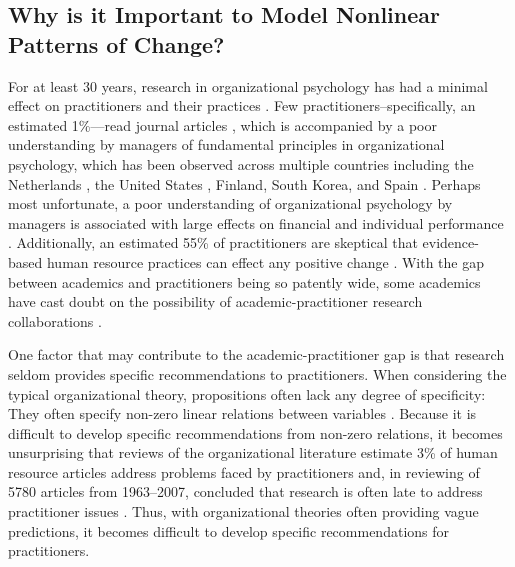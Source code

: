 \documentclass[
12pt, %
twoside,
english]{guelphthesis}
\begin{document}
\hypertarget{why-is-it-important-to-model-nonlinear-patterns-of-change}{%
\subsection{Why is it Important to Model Nonlinear Patterns of Change?}\label{why-is-it-important-to-model-nonlinear-patterns-of-change}}

For at least 30 years, research in organizational psychology has had a minimal effect on practitioners and their practices \autocites{daft1990}[for a review, see][]{lawler2022}. Few practitioners--specifically, an estimated 1\%---read journal articles \autocite{rynes2002a}, which is accompanied by a poor understanding by managers of fundamental principles in organizational psychology, which has been observed across multiple countries including the Netherlands \autocite{sanders2008}, the United States \autocite{rynes2002a}, Finland, South Korea, and Spain \autocite{tenhiälä2014}. Perhaps most unfortunate, a poor understanding of organizational psychology by managers is associated with large effects on financial and individual performance \autocite[for a review, see][]{rynes2002b}. Additionally, an estimated 55\% of practitioners are skeptical that evidence-based human resource practices can effect any positive change \autocite{kpmg2015}. With the gap between academics and practitioners being so patently wide, some academics have cast doubt on the possibility of academic-practitioner research collaborations \autocite{kieser2009}.

One factor that may contribute to the academic-practitioner gap is that research seldom provides specific recommendations to practitioners. When considering the typical organizational theory, propositions often lack any degree of specificity: They often specify non-zero linear relations between variables \autocite{edwards2010}. Because it is difficult to develop specific recommendations from non-zero relations, it becomes unsurprising that reviews of the organizational literature estimate 3\% of human resource articles address problems faced by practitioners \autocite{sackett1990} and, in reviewing of 5780 articles from 1963--2007, concluded that research is often late to address practitioner issues \autocite{cascio2008}. Thus, with organizational theories often providing vague predictions, it becomes difficult to develop specific recommendations for practitioners.
\end{document}
